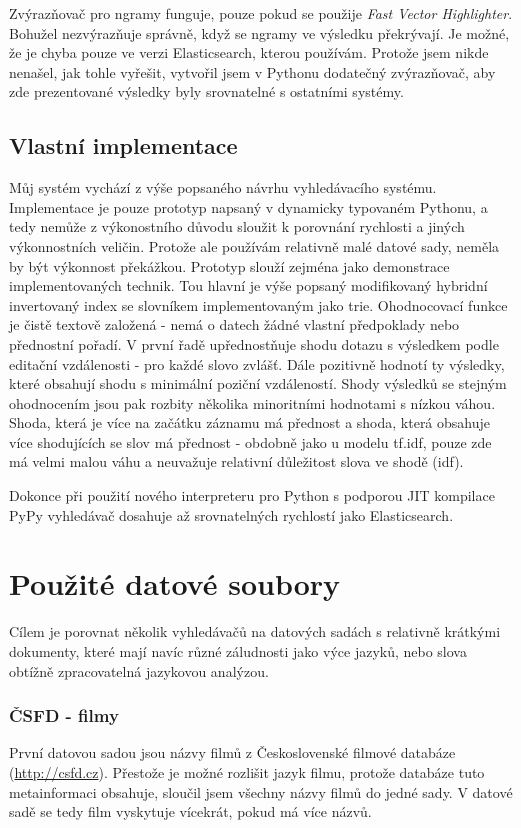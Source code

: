 \documentclass[12pt,letterpaper,oneside,openright]{book}
\begin{document}
Zvýrazňovač pro ngramy funguje, pouze pokud se použije \textit{Fast Vector
Highlighter}. Bohužel nezvýrazňuje správně, když se ngramy ve výsledku
překrývají. Je možné, že je chyba pouze ve verzi Elasticsearch, kterou
používám. Protože jsem nikde nenašel, jak tohle vyřešit, vytvořil jsem v
Pythonu dodatečný zvýrazňovač, aby zde prezentované výsledky byly srovnatelné s
ostatními systémy.

\subsection{Vlastní implementace}
Můj systém vychází z výše popsaného návrhu vyhledávacího systému. Implementace
je pouze prototyp napsaný v dynamicky typovaném Pythonu, a tedy nemůže z
výkonostního důvodu sloužit k porovnání rychlosti a jiných výkonnostních
veličin. Protože ale používám relativně malé datové sady, neměla by být
výkonnost překážkou. Prototyp slouží zejména jako demonstrace implementovaných
technik. Tou hlavní je výše popsaný modifikovaný hybridní invertovaný index se
slovníkem implementovaným jako trie.  Ohodnocovací funkce je čistě textově
založená - nemá o datech žádné vlastní předpoklady nebo přednostní pořadí. V
první řadě upřednostňuje shodu dotazu s výsledkem podle editační vzdálenosti -
pro každé slovo zvlášť. Dále pozitivně hodnotí ty výsledky, které obsahují
shodu s minimální poziční vzdáleností.  Shody výsledků se stejným ohodnocením
jsou pak rozbity několika minoritními hodnotami s nízkou váhou. Shoda, která je
více na začátku záznamu má přednost a shoda, která obsahuje více shodujících se
slov má přednost - obdobně jako u modelu tf.idf, pouze zde má velmi malou váhu
a neuvažuje relativní důležitost slova ve shodě (idf).

Dokonce při použití nového interpreteru pro Python s podporou JIT
kompilace PyPy vyhledávač dosahuje až srovnatelných rychlostí jako
Elasticsearch.


\section{Použité datové soubory}
Cílem je porovnat několik vyhledávačů na datových sadách s relativně krátkými
dokumenty, které mají navíc různé záludnosti jako výce jazyků, nebo slova
obtížně zpracovatelná jazykovou analýzou.

\subsubsection{ČSFD - filmy}
První datovou sadou jsou názvy filmů z Československé filmové databáze
(\url{http://csfd.cz}). Přestože je možné rozlišit jazyk filmu, protože
databáze tuto metainformaci obsahuje, sloučil jsem všechny názvy filmů
do jedné sady. V datové sadě se tedy film vyskytuje vícekrát, pokud má
více názvů.
\end{document}
